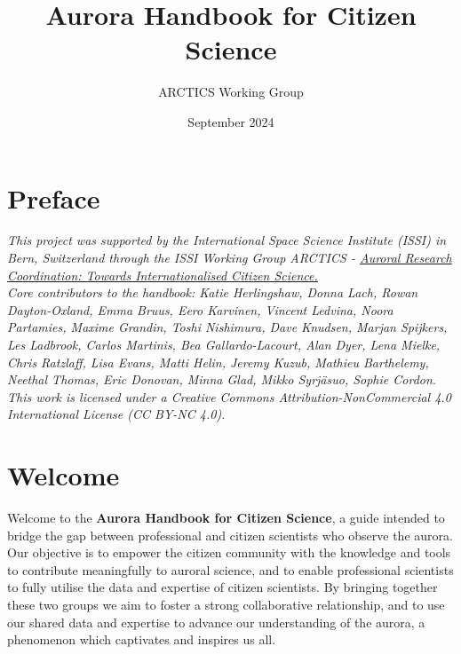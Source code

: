 \documentclass{article}
\title{Aurora Handbook for Citizen Science}
\author{ARCTICS Working Group}
\date{September 2024}
\newcommand{\contributed}[1]{%
    \par\noindent
    \begingroup
    \setlength{\leftskip}{1em}%
    \itshape
    Contributors: #1
    \par
    \endgroup
    \vspace{0.5em}
}
\begin{document}
\maketitle
\tableofcontents
\newpage

\section{Preface}
\textit{This project was supported by the International Space Science Institute (ISSI) in Bern, Switzerland through the ISSI Working Group ARCTICS - \href{https://collab.issibern.ch/arctics/}{Auroral Research Coordination: Towards Internationalised Citizen Science.}}\\
\textit{Core contributors to the handbook: Katie Herlingshaw, Donna Lach, Rowan Dayton-Oxland, Emma Bruus, Eero Karvinen, Vincent Ledvina, Noora Partamies, Maxime Grandin, Toshi Nishimura, Dave Knudsen, Marjan Spijkers, Les Ladbrook, Carlos Martinis, Bea Gallardo-Lacourt, Alan Dyer, Lena Mielke, Chris Ratzlaff, Lisa Evans, Matti Helin, Jeremy Kuzub, Mathieu Barthelemy, Neethal Thomas, Eric Donovan, Minna Glad, Mikko Syrjäsuo, Sophie Cordon.}\\
\textit{This work is licensed under a Creative Commons Attribution-NonCommercial 4.0 International License (CC BY-NC 4.0).}

 
\section{Welcome}
Welcome to the {\bf Aurora Handbook for Citizen Science}, a guide intended to bridge the gap between professional and citizen scientists who observe the aurora. Our objective is to empower the citizen community with the knowledge and tools to contribute meaningfully to auroral science, and to enable professional scientists to fully utilise the data and expertise of citizen scientists. By bringing together these two groups we aim to foster a strong collaborative relationship, and to use our shared data and expertise to advance our understanding of the aurora, a phenomenon which captivates and inspires us all. 

\end{document}
